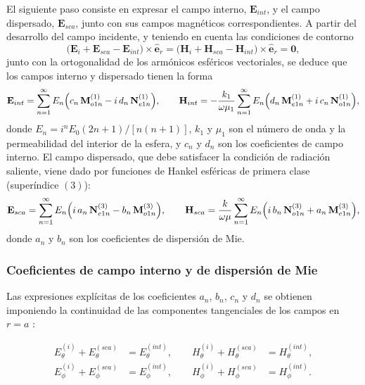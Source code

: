 El siguiente paso consiste en expresar el campo interno, $\mathbf{E}_{int}$, 
y el campo dispersado, $\mathbf{E}_{sca}$, junto con sus campos magnéticos 
correspondientes. A partir del desarrollo del campo incidente, y teniendo 
en cuenta las condiciones de contorno
\begin{equation}
  \bigl(\mathbf{E}_{i} + \mathbf{E}_{sca} - \mathbf{E}_{int}\bigr)
  \times \hat{\mathbf{e}}_r
  =
  \bigl(\mathbf{H}_{i} + \mathbf{H}_{sca} - \mathbf{H}_{int}\bigr)
  \times \hat{\mathbf{e}}_r
  = \mathbf{0},
\end{equation}
junto con la ortogonalidad de los armónicos esféricos vectoriales, se deduce
que los campos interno y dispersado tienen la forma
\begin{equation}
  \mathbf{E}_{int} =
  \sum_{n=1}^{\infty}
  E_{n}\Bigl(
    c_{n}\,\mathbf{M}_{o1n}^{(1)}
  - i\,d_{n}\,\mathbf{N}_{e1n}^{(1)}
  \Bigr),
  \qquad
  \mathbf{H}_{int} =
  -\frac{k_{1}}{\omega\mu_{1}}
  \sum_{n=1}^{\infty}
  E_{n}\Bigl(
    d_{n}\,\mathbf{M}_{e1n}^{(1)}
  + i\,c_{n}\,\mathbf{N}_{o1n}^{(1)}
  \Bigr),
\end{equation}
donde $E_{n} = i^{n}E_{0}(2n+1)/[n(n+1)]$, $k_{1}$ y $\mu_{1}$ son el número
de onda y la permeabilidad del interior de la esfera, y $c_{n}$ y $d_{n}$ son
los coeficientes de campo interno. El campo dispersado, que debe satisfacer la
condición de radiación saliente, viene dado por funciones de Hankel esféricas
de primera clase (superíndice $(3)$):
\begin{equation}
  \mathbf{E}_{sca} =
  \sum_{n=1}^{\infty}
  E_{n}\Bigl(
    i\,a_{n}\,\mathbf{N}_{e1n}^{(3)}
  - b_{n}\,\mathbf{M}_{o1n}^{(3)}
  \Bigr),
  \qquad
  \mathbf{H}_{sca} =
  \frac{k}{\omega\mu}
  \sum_{n=1}^{\infty}
  E_{n}\Bigl(
    i\,b_{n}\,\mathbf{N}_{o1n}^{(3)}
  + a_{n}\,\mathbf{M}_{e1n}^{(3)}
  \Bigr),
\end{equation}
donde $a_{n}$ y $b_{n}$ son los coeficientes de dispersión de Mie.


\subsubsection{Coeficientes de campo interno y de dispersión de Mie}
\label{sec:miecoeffs}

Las expresiones explícitas de los coeficientes $a_{n}$, $b_{n}$, $c_{n}$ y $d_{n}$ 
se obtienen imponiendo la continuidad de las componentes 
tangenciales de los campos en $r = a$ \cite{Bohren1983}:

\[
\begin{aligned}
  E_\theta^{(i)} + E_\theta^{(sca)} &= E_\theta^{({int})}, \qquad   H_\theta^{(i)} + H_\theta^{(sca)} &= H_\theta^{({int})},\\
  E_\phi^{(i)}   + E_\phi^{(sca)}   &= E_\phi^{({int})},   \qquad  H_\phi^{(i)}   + H_\phi^{(sca)}   &= H_\phi^{({int})}. \\
\end{aligned}
\]

